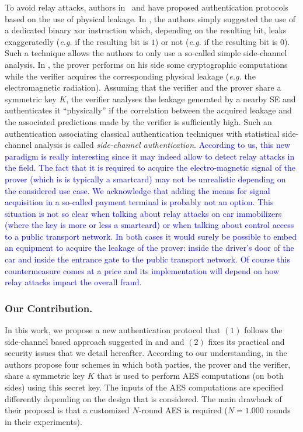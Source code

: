 \documentclass{llncs}
\newcommand\add[1]{\textcolor{blue}{#1}}
\begin{document}
To avoid relay attacks, authors in~\cite{SakiyamaMMKHMMN15} and \cite{DBLP:conf/ccs/ReidNTS07} have proposed authentication protocols based on the use of physical leakage.
In \cite{DBLP:conf/ccs/ReidNTS07}, the authors simply suggested the use of a dedicated binary xor instruction which, depending on the resulting bit, leaks exaggeratedly (\emph{e.g.} if the resulting bit is $1$) or not (\emph{e.g.} if the resulting bit is $0$). Such a technique allows the authors to only use a so-called simple side-channel analysis.
In \cite{SakiyamaMMKHMMN15}, the prover performs on his side some cryptographic computations while the verifier acquires the corresponding physical leakage (\emph{e.g.} the electromagnetic radiation).
Assuming that the verifier and the prover share a symmetric key $K$, the verifier analyses the leakage generated by a nearby SE and authenticates it ``physically'' if the correlation between the acquired leakage and the associated predictions made by the verifier is sufficiently high. Such an authentication associating classical authentication techniques with statistical side-channel analysis is called \textit{side-channel authentication}.  
\add{According to us, this new paradigm is really interesting since it may indeed allow to detect relay attacks in the field. The fact that it is required to acquire the electro-magnetic signal of the prover (which is is typically a smartcard) may not be unrealistic depending on the considered use case. We acknowledge that adding the means for signal acquisition in a so-called  payment terminal is probably not an option. This situation is not so clear when talking about relay attacks on car immobilizers (where the key is more or less a smartcard) or when talking about control access to a public transport network. In both cases it would surely be possible to embed an equipment to acquire the leakage of the prover: inside the driver's door of the car and inside the entrance gate to the public transport network. Of course this countermeasure comes at a price and its implementation will depend on how relay attacks impact the overall fraud.}

\subsubsection{Our Contribution.}
In this work, we propose a new authentication protocol that $(1)$ follows the side-channel based approach suggested in \cite{SakiyamaMMKHMMN15} and \cite{DBLP:conf/ccs/ReidNTS07} and $(2)$ fixes its practical and security issues that we detail hereafter.
According to our understanding, in \cite{SakiyamaMMKHMMN15} the authors propose four schemes in which both parties, the prover and the verifier, share a symmetric key $K$ that is used to perform AES computations (on both sides) using this secret key. The inputs of the AES computations are specified differently depending on the design that is considered. The main drawback of their proposal is that a customized $N$-round AES is required ($N=1.000$ rounds in their experiments). 
\end{document}
